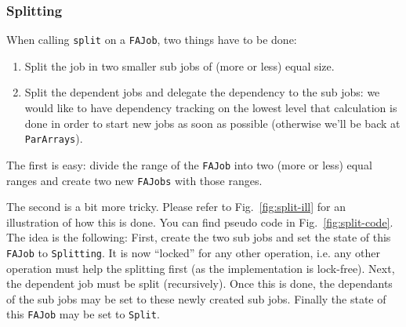 \documentclass[runningheads,a4paper,fleqn]{llncs}
\begin{document}
\subsubsection{Splitting}
When calling \texttt{split} on a \texttt{FAJob}, two things have to be
done:
\begin{enumerate}
\item Split the job in two smaller sub jobs of (more or less) equal
  size.
\item Split the dependent jobs and delegate the dependency to the
  sub jobs: we would like to have dependency tracking on the lowest
  level that calculation is done in order to start new jobs as soon as
  possible (otherwise we'll be back at \texttt{ParArrays}).
\end{enumerate}

The first is easy: divide the range of the \texttt{FAJob} into two
(more or less) equal ranges and create two new \texttt{FAJobs} with
those ranges.

The second is a bit more tricky. Please refer to Fig.~\ref{fig:split-ill}
for an illustration of how this is done. You can find pseudo code in
Fig.~\ref{fig:split-code}. The idea is the following: First, create the
two sub jobs and set the state of this \texttt{FAJob} to
\texttt{Splitting}. It is now ``locked'' for any other operation,
i.e. any
other operation must help the splitting first (as the implementation
is lock-free). Next, the dependent job must be split
(recursively). Once this is done, the dependants of the sub jobs may be
set to these newly created sub jobs. Finally the state of this
\texttt{FAJob} may be set to \texttt{Split}.
\end{document}
